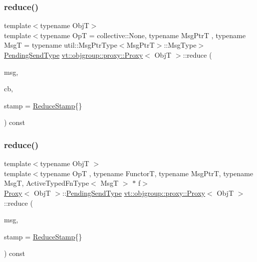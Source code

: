 \subsubsection{\texorpdfstring{reduce()}{reduce()}\hspace{0.1cm}{\footnotesize\ttfamily [4/7]}}
{\footnotesize\ttfamily template$<$typename ObjT$>$ \\
template$<$typename OpT  = collective\+::\+None, typename Msg\+PtrT , typename MsgT  = typename util\+::\+Msg\+Ptr\+Type$<$\+Msg\+Ptr\+T$>$\+::\+Msg\+Type$>$ \\
\hyperlink{structvt_1_1objgroup_1_1proxy_1_1_proxy_a1bdf8713203531d306702a024872bb08}{Pending\+Send\+Type} \hyperlink{structvt_1_1objgroup_1_1proxy_1_1_proxy}{vt\+::objgroup\+::proxy\+::\+Proxy}$<$ ObjT $>$\+::reduce (\begin{DoxyParamCaption}\item[{Msg\+PtrT}]{msg,  }\item[{\hyperlink{namespacevt_a57b238783d05de96bc2c4027f7073b7f}{Callback}$<$ MsgT $>$}]{cb,  }\item[{\hyperlink{structvt_1_1objgroup_1_1proxy_1_1_proxy_a337be4c20cf11ff6477c7a66208cc909}{Reduce\+Stamp}}]{stamp = {\ttfamily \hyperlink{structvt_1_1objgroup_1_1proxy_1_1_proxy_a337be4c20cf11ff6477c7a66208cc909}{Reduce\+Stamp}\{\}} }\end{DoxyParamCaption}) const\hspace{0.3cm}{\ttfamily [inline]}}

\mbox{\label{structvt_1_1objgroup_1_1proxy_1_1_proxy_a55fdba093739d439d22076815e1ad424}} 
\subsubsection{\texorpdfstring{reduce()}{reduce()}\hspace{0.1cm}{\footnotesize\ttfamily [5/7]}}
{\footnotesize\ttfamily template$<$typename ObjT $>$ \\
template$<$typename OpT , typename FunctorT, typename Msg\+PtrT, typename MsgT, Active\+Typed\+Fn\+Type$<$ Msg\+T $>$ $\ast$ f$>$ \\
\hyperlink{structvt_1_1objgroup_1_1proxy_1_1_proxy}{Proxy}$<$ ObjT $>$\+::\hyperlink{structvt_1_1objgroup_1_1proxy_1_1_proxy_a1bdf8713203531d306702a024872bb08}{Pending\+Send\+Type} \hyperlink{structvt_1_1objgroup_1_1proxy_1_1_proxy}{vt\+::objgroup\+::proxy\+::\+Proxy}$<$ ObjT $>$\+::reduce (\begin{DoxyParamCaption}\item[{Msg\+PtrT}]{msg,  }\item[{\hyperlink{structvt_1_1objgroup_1_1proxy_1_1_proxy_a337be4c20cf11ff6477c7a66208cc909}{Reduce\+Stamp}}]{stamp = {\ttfamily \hyperlink{structvt_1_1objgroup_1_1proxy_1_1_proxy_a337be4c20cf11ff6477c7a66208cc909}{Reduce\+Stamp}\{\}} }\end{DoxyParamCaption}) const}



